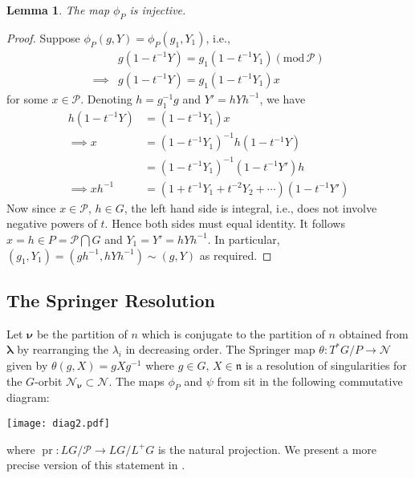 \documentclass[paper=a4, fontsize=10pt]{amsart} %
\theoremstyle{plain}
\newtheorem{lemma}[subsection]{Lemma}
\theoremstyle{definition}
\theoremstyle{remark}
\numberwithin{equation}{section} %
\numberwithin{figure}{section} %
\numberwithin{table}{section} %
\numberwithin{subsection}{section} %
\def\gl{\ensuremath{G}}
\def\gL{\ensuremath{L\gl}}
\def\gLhat{\gL}
\def\gOhat{\ensuremath{L^+\gl}}
\def\para{\ensuremath{P}}
\def\Para{\ensuremath{\mathcal P}}
\def\Y{\ensuremath{Y}}
\def\Ni{\ensuremath{\mathcal N}}
\def\mod{\ensuremath{\mathrm{mod}\,}}
\begin{document}
\begin{lemma}
The map $\phi_\para$ is injective.
\end{lemma}
\begin{proof}
Suppose $\phi_\para(g,\Y)=\phi_\para(g_1,\Y_1)$, i.e., \begin{align*}
                &g\left(1-t^{-1}\Y\right)=g_1\left(1-t^{-1}\Y_1\right)(\mod\Para) \\
    \implies    &g\left(1-t^{-1}\Y\right)=g_1\left(1-t^{-1}\Y_1\right)x
\end{align*}
for some $x\in\Para$. 
Denoting $h=g_1^{-1}g$ and $\Y'=h\Y h^{-1}$, we have
 \begin{align*}
    h\left(1-t^{-1}\Y\right)&=\left(1-t^{-1}\Y_1\right)x\\
    \implies    x           &=\left(1-t^{-1}\Y_1\right)^{-1}h\left(1-t^{-1}\Y\right)\\
                            &=\left(1-t^{-1}\Y_1\right)^{-1}\left(1-t^{-1}\Y'\right)h\\
    \implies    xh^{-1}     &=\left(1+t^{-1}\Y_1+t^{-2}\Y_2+\cdots\right)\left(1-t^{-1}\Y'\right)
\end{align*}
Now since $x\in\Para,\,h\in\gl$, the left hand side is integral, i.e., does not involve negative powers of $t$.
Hence both sides must equal identity. 
It follows $x=h\in\para=\Para\bigcap\gl$ and
$                \Y_1=\Y'=h\Y h^{-1}$.
In particular, $\left(g_1,\Y_1\right)=\left(gh^{-1},h\Y h^{-1}\right)\sim\left(g,\Y\right)$ as required.
\end{proof}

\subsection{The Springer Resolution}
\label{springer}
Let $\boldsymbol\nu$ be the partition of $n$ which is conjugate to the partition of $n$ obtained from $\boldsymbol\lambda$ by rearranging the $\lambda_i$ in decreasing order.
The Springer map $\theta:T^*\gl/P\rightarrow\Ni$ given by $\theta\left(g,X\right)=gXg^{-1}$ where $g\in\gl,\, X\in\mathfrak n$ is a resolution of singularities for the \gl-orbit $\Ni_{\boldsymbol\nu}\subset\Ni$.
The maps $\phi_P$ and $\psi$ from  sit in the following commutative diagram:
\begin{center}
\texttt{[image: diag2.pdf]}
\end{center}
where $\operatorname{pr}:\gLhat/\Para\rightarrow\gLhat/\gOhat$ is the natural projection. 
We present a more precise version of this statement in .
\end{document}
